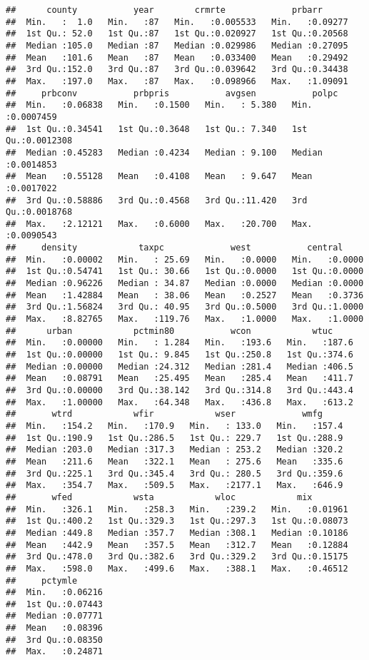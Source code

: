 \documentclass[]{article}
\begin{document}
\begin{verbatim}
##      county           year        crmrte             prbarr       
##  Min.   :  1.0   Min.   :87   Min.   :0.005533   Min.   :0.09277  
##  1st Qu.: 52.0   1st Qu.:87   1st Qu.:0.020927   1st Qu.:0.20568  
##  Median :105.0   Median :87   Median :0.029986   Median :0.27095  
##  Mean   :101.6   Mean   :87   Mean   :0.033400   Mean   :0.29492  
##  3rd Qu.:152.0   3rd Qu.:87   3rd Qu.:0.039642   3rd Qu.:0.34438  
##  Max.   :197.0   Max.   :87   Max.   :0.098966   Max.   :1.09091  
##     prbconv           prbpris           avgsen           polpc          
##  Min.   :0.06838   Min.   :0.1500   Min.   : 5.380   Min.   :0.0007459  
##  1st Qu.:0.34541   1st Qu.:0.3648   1st Qu.: 7.340   1st Qu.:0.0012308  
##  Median :0.45283   Median :0.4234   Median : 9.100   Median :0.0014853  
##  Mean   :0.55128   Mean   :0.4108   Mean   : 9.647   Mean   :0.0017022  
##  3rd Qu.:0.58886   3rd Qu.:0.4568   3rd Qu.:11.420   3rd Qu.:0.0018768  
##  Max.   :2.12121   Max.   :0.6000   Max.   :20.700   Max.   :0.0090543  
##     density            taxpc             west           central      
##  Min.   :0.00002   Min.   : 25.69   Min.   :0.0000   Min.   :0.0000  
##  1st Qu.:0.54741   1st Qu.: 30.66   1st Qu.:0.0000   1st Qu.:0.0000  
##  Median :0.96226   Median : 34.87   Median :0.0000   Median :0.0000  
##  Mean   :1.42884   Mean   : 38.06   Mean   :0.2527   Mean   :0.3736  
##  3rd Qu.:1.56824   3rd Qu.: 40.95   3rd Qu.:0.5000   3rd Qu.:1.0000  
##  Max.   :8.82765   Max.   :119.76   Max.   :1.0000   Max.   :1.0000  
##      urban            pctmin80           wcon            wtuc      
##  Min.   :0.00000   Min.   : 1.284   Min.   :193.6   Min.   :187.6  
##  1st Qu.:0.00000   1st Qu.: 9.845   1st Qu.:250.8   1st Qu.:374.6  
##  Median :0.00000   Median :24.312   Median :281.4   Median :406.5  
##  Mean   :0.08791   Mean   :25.495   Mean   :285.4   Mean   :411.7  
##  3rd Qu.:0.00000   3rd Qu.:38.142   3rd Qu.:314.8   3rd Qu.:443.4  
##  Max.   :1.00000   Max.   :64.348   Max.   :436.8   Max.   :613.2  
##       wtrd            wfir            wser             wmfg      
##  Min.   :154.2   Min.   :170.9   Min.   : 133.0   Min.   :157.4  
##  1st Qu.:190.9   1st Qu.:286.5   1st Qu.: 229.7   1st Qu.:288.9  
##  Median :203.0   Median :317.3   Median : 253.2   Median :320.2  
##  Mean   :211.6   Mean   :322.1   Mean   : 275.6   Mean   :335.6  
##  3rd Qu.:225.1   3rd Qu.:345.4   3rd Qu.: 280.5   3rd Qu.:359.6  
##  Max.   :354.7   Max.   :509.5   Max.   :2177.1   Max.   :646.9  
##       wfed            wsta            wloc            mix         
##  Min.   :326.1   Min.   :258.3   Min.   :239.2   Min.   :0.01961  
##  1st Qu.:400.2   1st Qu.:329.3   1st Qu.:297.3   1st Qu.:0.08073  
##  Median :449.8   Median :357.7   Median :308.1   Median :0.10186  
##  Mean   :442.9   Mean   :357.5   Mean   :312.7   Mean   :0.12884  
##  3rd Qu.:478.0   3rd Qu.:382.6   3rd Qu.:329.2   3rd Qu.:0.15175  
##  Max.   :598.0   Max.   :499.6   Max.   :388.1   Max.   :0.46512  
##     pctymle       
##  Min.   :0.06216  
##  1st Qu.:0.07443  
##  Median :0.07771  
##  Mean   :0.08396  
##  3rd Qu.:0.08350  
##  Max.   :0.24871
\end{verbatim}
\end{document}
